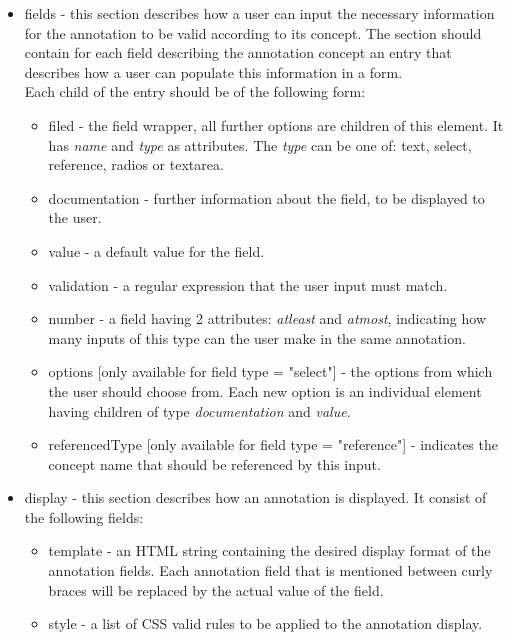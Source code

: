 \documentclass[a4paper, 12pt, notitlepage]{report}
\begin{document}
\begin{itemize}
 \item fields - this section describes how a user can input the necessary
information for the annotation to be valid according to its concept. The section
should contain for each field describing the annotation concept an entry that describes how a user can populate this information in a form.\\
Each child of the entry should be of the following form:
  \begin{itemize}
   \item filed - the field wrapper, all further options are children of this element. It has \textit{name} and \textit{type} as attributes. The \textit{type} can be
   one of: text, select, reference, radios or textarea.
   \item documentation - further information about the field, to be displayed to the user.
   \item value - a default value for the field.
   \item validation - a regular expression that the user input must match.
   \item number - a field having 2 attributes: \textit{atleast} and \textit{atmost}, indicating how many inputs of this type can the user make in the same annotation.
   \item options [only available for field type = "select"] - the options from which the user should choose from. Each new option is an individual element having children
   of type \textit{documentation} and \textit{value}.
   \item referencedType [only available for field type = "reference"] - indicates the concept name that should be referenced by this input.
  \end{itemize}
  \item display - this section describes how an annotation is displayed. It consist of the following fields:
  \begin{itemize}
   \item template - an HTML string containing the desired display format of the annotation fields. Each annotation field that is mentioned between curly
  braces will be replaced by the actual value of the field.
   \item style - a list of CSS valid rules to be applied to the annotation display.
  \end{itemize}

\end{itemize}
\end{document}
